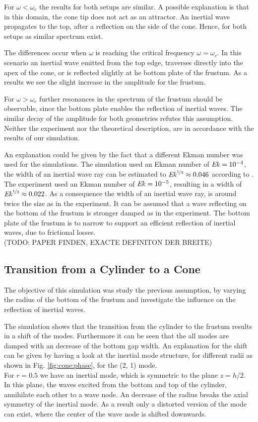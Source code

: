 For $\omega < \omega_c$ the results for both setups are similar.
A possible explanation is that in this domain, the cone tip does not act as an attractor.
An inertial wave propagates to the top, after a reflection on the side of the cone.
Hence, for both setups as similar spectrum exist.

The differences occur when $\omega$ is reaching the critical frequency $\omega = \omega_c$. In this scenario an inertial wave emitted from the
top edge, traverses directly into the apex of the cone, or is reflected slightly at he bottom plate of the frustum.
As a results we see the slight increase in the amplitude for the frustum.

For $\omega > \omega_c$ further resonances in the spectrum of the frustum should be observable,
since the bottom plate enables the reflection of inertial waves.
The similar decay of the amplitude for both geometries refutes this assumption.
Neither the experiment nor the theoretical description, are in accordance with the results of our simulation.

An explanation could be given by the fact that a different Ekman number was used for the simulations.
The simulation used an Ekman number of $\mbox{\textit{Ek}} = 10^{-4}$, the width
of an inertial wave ray can be estimated to $\mbox{\textit{Ek}}^{\nicefrac{1}{3}}\approx 0.046$ according to \citep{ATPAPER???}.
The experiment used an Ekman number of $\mbox{\textit{Ek}} = 10^{-5}$, resulting in a  width of $\mbox{\textit{Ek}}^{\nicefrac{1}{3}}\approx 0.022$.
As a consequence the width of an inertial wave ray, is around twice the size as in the experiment.
It can be assumed that a wave reflecting on the bottom of the frustum
is stronger damped as in the experiment.
The bottom plate of the frustum is to narrow to support an efficient reflection
of inertial waves, due to frictional losses.\\
(TODO: PAPER FINDEN, EXACTE DEFINITON DER BREITE)

\subsection{Transition from a Cylinder to a Cone}

The objective of this simulation was study the previous assumption,
by varying the radius of the bottom of the frustum and investigate the influence
on the reflection of inertial waves.

The simulation shows that the transition from the cylinder
to the frustum results in a shift of the modes.
Furthermore it can be seen that the all modes are damped with an decrease of the bottom gap width.
An explanation for the shift can be given by having a look at the inertial mode structure,
for different radii as shown in Fig. \ref{fig:cone:phase}, for the (2, 1) mode.\\
For $r=0.5$ we have an inertial mode, which is symmetric to the plane $z=h/2$.
In this plane, the waves excited from the bottom and top of the cylinder, annihilate each other to a wave node.
An decrease of the radius breaks the axial symmetry of the inertial mode.
As a result only a distorted version of the mode can exist, where the center of the wave node
is shifted downwards.

